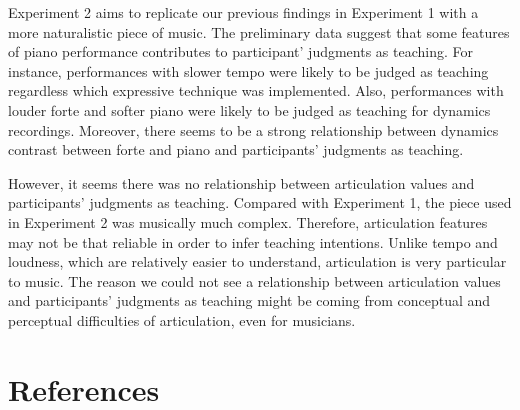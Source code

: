 \documentclass[
  man,floatsintext]{apa6}
\begin{document}
Experiment 2 aims to replicate our previous findings in Experiment 1 with a more naturalistic piece of music. The preliminary data suggest that some features of piano performance contributes to participant' judgments as teaching. For instance, performances with slower tempo were likely to be judged as teaching regardless which expressive technique was implemented. Also, performances with louder forte and softer piano were likely to be judged as teaching for dynamics recordings. Moreover, there seems to be a strong relationship between dynamics contrast between forte and piano and participants' judgments as teaching.

However, it seems there was no relationship between articulation values and participants' judgments as teaching. Compared with Experiment 1, the piece used in Experiment 2 was musically much complex. Therefore, articulation features may not be that reliable in order to infer teaching intentions. Unlike tempo and loudness, which are relatively easier to understand, articulation is very particular to music. The reason we could not see a relationship between articulation values and participants' judgments as teaching might be coming from conceptual and perceptual difficulties of articulation, even for musicians.

\newpage

\hypertarget{references}{%
\section{References}\label{references}}

\begingroup
\setlength{\parindent}{-0in}
\setlength{\leftskip}{0in}
\end{document}
